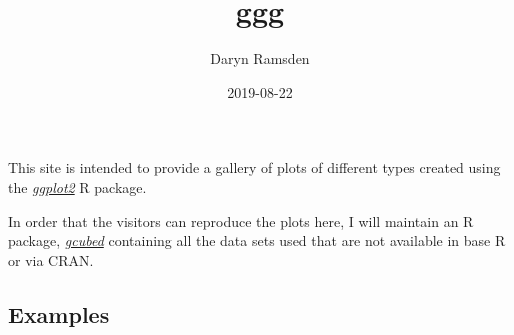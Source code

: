\documentclass[]{book}
\title{ggg}
\author{Daryn Ramsden}
\date{2019-08-22}
\begin{document}
\maketitle

{
\setcounter{tocdepth}{1}
\tableofcontents
}
\hypertarget{Intro}{%
\chapter*{}\label{Intro}}

This site is intended to provide a gallery of plots of different types created using the \protect\hyperlink{ggplot}{\emph{ggplot2}} R package.

In order that the visitors can reproduce the plots here, I will maintain an R package, \protect\hyperlink{gcubed}{\emph{gcubed}} containing all the data sets used that are not available in base R or via CRAN.

\hypertarget{examples}{%
\section*{\texorpdfstring{\textbf{Examples}}{Examples}}\label{examples}}

\leavevmode\hypertarget{unemp1tn}{}%

\leavevmode\hypertarget{unemp2tn}{}%

\leavevmode\hypertarget{unemp3tn}{}%

\leavevmode\hypertarget{unemp4tn}{}%

\leavevmode\hypertarget{appletn}{}%

\leavevmode\hypertarget{budgettn}{}%

\leavevmode\hypertarget{atptn}{}%

\leavevmode\hypertarget{wtatn}{}%

\leavevmode\hypertarget{sptn}{}%

\leavevmode\hypertarget{sptn}{}%

\leavevmode\hypertarget{tfwrtn}{}%

\leavevmode\hypertarget{lifeexcountriestn}{}%

\leavevmode\hypertarget{metsbartn}{}%

\leavevmode\hypertarget{nleastbarstn}{}%

\leavevmode\hypertarget{nleastgamesabovetn}{}%

\leavevmode\hypertarget{chihisttn}{}%

\leavevmode\hypertarget{chicomphisttn}{}%
\end{document}

